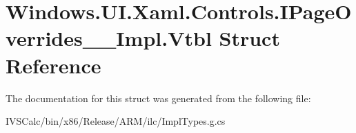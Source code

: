 \hypertarget{struct_windows_1_1_u_i_1_1_xaml_1_1_controls_1_1_i_page_overrides_____impl_1_1_vtbl}{}\section{Windows.\+U\+I.\+Xaml.\+Controls.\+I\+Page\+Overrides\+\_\+\+\_\+\+Impl.\+Vtbl Struct Reference}
\label{struct_windows_1_1_u_i_1_1_xaml_1_1_controls_1_1_i_page_overrides_____impl_1_1_vtbl}


The documentation for this struct was generated from the following file\+:\begin{DoxyCompactItemize}
\item 
I\+V\+S\+Calc/bin/x86/\+Release/\+A\+R\+M/ilc/Impl\+Types.\+g.\+cs\end{DoxyCompactItemize}
